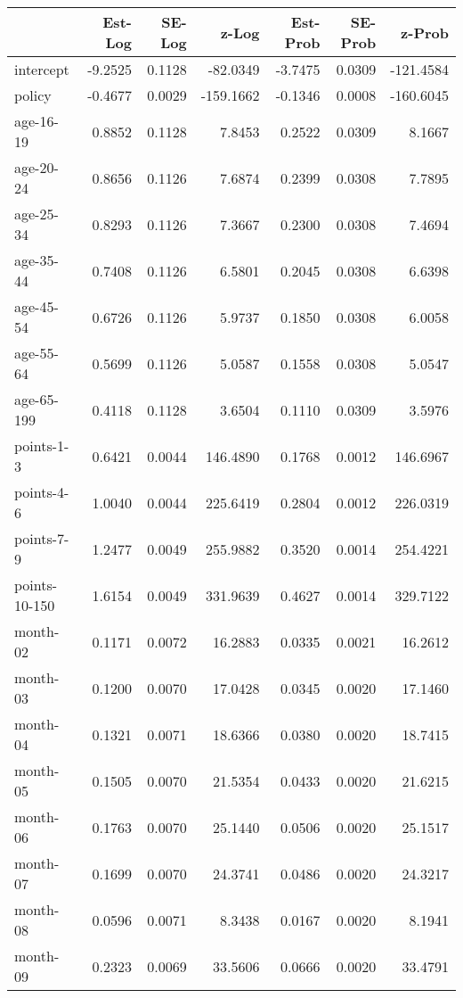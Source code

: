 \documentclass[10pt]{article}
\begin{document}
\begin{table}[ht]
\centering
\begin{tabular}{lrrrrrr}
  \hline
 & Est-Log & SE-Log & z-Log & Est-Prob & SE-Prob & z-Prob \\ 
  \hline
intercept & -9.2525 & 0.1128 & -82.0349 & -3.7475 & 0.0309 & -121.4584 \\ 
  policy & -0.4677 & 0.0029 & -159.1662 & -0.1346 & 0.0008 & -160.6045 \\ 
  age-16-19 & 0.8852 & 0.1128 & 7.8453 & 0.2522 & 0.0309 & 8.1667 \\ 
  age-20-24 & 0.8656 & 0.1126 & 7.6874 & 0.2399 & 0.0308 & 7.7895 \\ 
  age-25-34 & 0.8293 & 0.1126 & 7.3667 & 0.2300 & 0.0308 & 7.4694 \\ 
  age-35-44 & 0.7408 & 0.1126 & 6.5801 & 0.2045 & 0.0308 & 6.6398 \\ 
  age-45-54 & 0.6726 & 0.1126 & 5.9737 & 0.1850 & 0.0308 & 6.0058 \\ 
  age-55-64 & 0.5699 & 0.1126 & 5.0587 & 0.1558 & 0.0308 & 5.0547 \\ 
  age-65-199 & 0.4118 & 0.1128 & 3.6504 & 0.1110 & 0.0309 & 3.5976 \\ 
  points-1-3 & 0.6421 & 0.0044 & 146.4890 & 0.1768 & 0.0012 & 146.6967 \\ 
  points-4-6 & 1.0040 & 0.0044 & 225.6419 & 0.2804 & 0.0012 & 226.0319 \\ 
  points-7-9 & 1.2477 & 0.0049 & 255.9882 & 0.3520 & 0.0014 & 254.4221 \\ 
  points-10-150 & 1.6154 & 0.0049 & 331.9639 & 0.4627 & 0.0014 & 329.7122 \\ 
  month-02 & 0.1171 & 0.0072 & 16.2883 & 0.0335 & 0.0021 & 16.2612 \\ 
  month-03 & 0.1200 & 0.0070 & 17.0428 & 0.0345 & 0.0020 & 17.1460 \\ 
  month-04 & 0.1321 & 0.0071 & 18.6366 & 0.0380 & 0.0020 & 18.7415 \\ 
  month-05 & 0.1505 & 0.0070 & 21.5354 & 0.0433 & 0.0020 & 21.6215 \\ 
  month-06 & 0.1763 & 0.0070 & 25.1440 & 0.0506 & 0.0020 & 25.1517 \\ 
  month-07 & 0.1699 & 0.0070 & 24.3741 & 0.0486 & 0.0020 & 24.3217 \\ 
  month-08 & 0.0596 & 0.0071 & 8.3438 & 0.0167 & 0.0020 & 8.1941 \\ 
  month-09 & 0.2323 & 0.0069 & 33.5606 & 0.0666 & 0.0020 & 33.4791 \\ 

\end{tabular}
\end{table}
\end{document}
